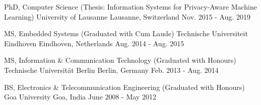 

\begin{cventries}

  	\vspace{-0.1cm}
    \cventry
    {PhD, Computer Science (Thesis: Information Systems for Privacy-Aware Machine Learning)} %
    {University of Lausanne} %
    {Lausanne, Switzerland} %
    {Nov. 2015 - Aug. 2019} %
    {}
    
    \vspace{-0.3cm}
    \cventry
    {MS, Embedded Systems (Graduated with Cum Laude)}
    {Technische Universiteit Eindhoven}
    {Eindhoven, Netherlands}
    {Aug. 2014 - Aug. 2015}
    {}
	
	\vspace{-0.3cm}
    \cventry
    {MS, Information \& Communication Technology (Graduated with Honours)} %
    {Technische Universität Berlin} %
    {Berlin, Germany} %
    {Feb. 2013 - Aug. 2014} %
    {}
	
	\vspace{-0.3cm}
    \cventry
    {BS, Electronics \& Telecommunication Engineering (Graduated with Honours)} %
    {Goa University} %
    {Goa, India} %
    {June 2008 - May 2012} %
    {}
	
	\vspace{-0.9cm}
\end{cventries}

